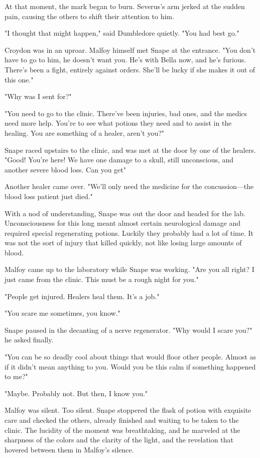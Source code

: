 At that moment, the mark began to burn. Severus's arm jerked at the sudden pain, causing the others to shift their attention to him.

"I thought that might happen," said Dumbledore quietly. "You had best go."

Croydon was in an uproar. Malfoy himself met Snape at the entrance. "You don't have to go to him, he doesn't want you. He's with Bella now, and he's furious. There's been a fight, entirely against orders. She'll be lucky if she makes it out of this one."

"Why was I sent for?"

"You need to go to the clinic. There've been injuries, bad ones, and the medics need more help. You're to see what potions they need and to assist in the healing. You are something of a healer, aren't you?"

Snape raced upstairs to the clinic, and was met at the door by one of the healers. "Good! You're here! We have one damage to a skull, still unconscious, and another severe blood loss. Can you get{\el}"

Another healer came over. "We'll only need the medicine for the concussion—the blood loss patient just died."

With a nod of understanding, Snape was out the door and headed for the lab. Unconsciousness for this long meant almost certain neurological damage and required special regenerating potions. Luckily they probably had a lot of time. It was not the sort of injury that killed quickly, not like losing large amounts of blood.

Malfoy came up to the laboratory while Snape was working. "Are you all right? I just came from the clinic. This must be a rough night for you."

"People get injured. Healers heal them. It's a job."

"You scare me sometimes, you know."

Snape paused in the decanting of a nerve regenerator. "Why would I scare you?" he asked finally.

"You can be so deadly cool about things that would floor other people. Almost as if it didn't mean anything to you. Would you be this calm if something happened to me?"

"Maybe. Probably not. But then, I know you."

Malfoy was silent. Too silent. Snape stoppered the flask of potion with exquisite care and checked the others, already finished and waiting to be taken to the clinic. The lucidity of the moment was breathtaking, and he marveled at the sharpness of the colors and the clarity of the light, and the revelation that hovered between them in Malfoy's silence.

